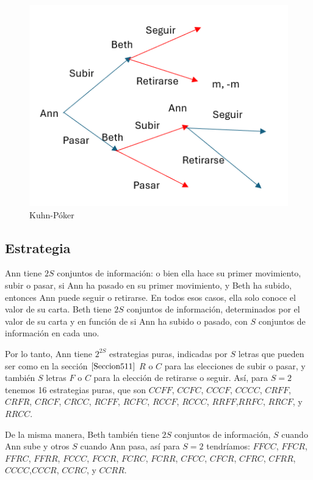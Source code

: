 \documentclass[12pt,a4paper,]{book}
\numberwithin{dummy}{section}
\theoremstyle{ocrenumbox}
\theoremstyle{blacknumex}
\theoremstyle{blacknumbox}
\theoremstyle{ocrenum}
\theoremstyle{ocrenum}
\begin{document}
\begin{figure}[H]

{\centering \includegraphics[width=0.8\linewidth]{extensiva_Kuhn} 

}

\caption{\label{forma_extensiva_VNM}Kuhn-Póker}\label{fig:forma_extensiva_VNM}
\end{figure}

\hypertarget{Seccion521}{%
\subsection{Estrategia}\label{Seccion521}}

Ann tiene \(2S\) conjuntos de información: o bien ella hace su primer
movimiento, subir o pasar, si Ann ha pasado en su primer movimiento, y
Beth ha subido, entonces Ann puede seguir o retirarse. En todos esos
casos, ella solo conoce el valor de su carta. Beth tiene \(2S\)
conjuntos de información, determinados por el valor de su carta y en
función de si Ann ha subido o pasado, con \(S\) conjuntos de información
en cada uno.

Por lo tanto, Ann tiene \(2^{2S}\) estrategias puras, indicadas por
\(S\) letras que pueden ser como en la sección \(\ref{Seccion511}\)
\(R\) o \(C\) para las elecciones de subir o pasar, y también \(S\)
letras \(F\) o \(C\) para la elección de retirarse o seguir. Así, para
\(S=2\) tenemos 16 estrategias puras, que son \(CCFF\), \(CCFC\),
\(CCCF\), \(CCCC\), \(CRFF\), \(CRFR\), \(CRCF\), \(CRCC\), \(RCFF\),
\(RCFC\), \(RCCF\), \(RCCC\), \(RRFF\),\(RRFC\), \(RRCF\), y \(RRCC\).

De la misma manera, Beth también tiene \(2S\) conjuntos de información,
\(S\) cuando Ann sube y otros \(S\) cuando Ann pasa, así para \(S=2\)
tendríamos: \(FFCC\), \(FFCR\), \(FFRC\), \(FFRR\), \(FCCC\), \(FCCR\),
\(FCRC\), \(FCRR\), \(CFCC\), \(CFCR\), \(CFRC\), \(CFRR\),
\(CCCC\),\(CCCR\), \(CCRC\), y \(CCRR\).
\end{document}
